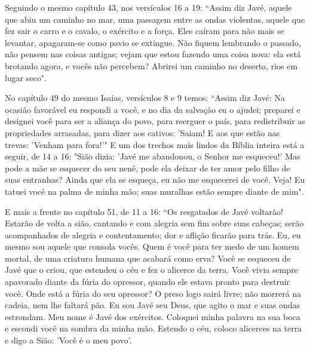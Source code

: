 \emdash{}Seguindo o mesmo capítulo 43, nos versículos 16 a 19: ``Assim diz Javé, aquele que abiu um caminho no mar, uma passagem entre as ondas violentas, aquele que fez sair o carro e o cavalo, o exército e a força. Eles caíram para não mais se levantar, apagaram-se como pavio se extingue. Não fiquem lembrando o passado, não pensem nas coisas antigas; vejam que estou fazendo uma coisa nova: ela está brotando agora, e vocês não percebem? Abrirei um caminho no deserto, rios em lugar seco".

\emdash{}No capítulo 49 do mesmo Isaías, versículos 8 e 9 temos: ``Assim diz Javé: Na ocasião favorável eu respondi a você, e no dia da salvação eu o ajudei; preparei e designei você para ser a aliança do povo, para reerguer o país, para redistribuir as propriedades arrasadas, para dizer aos cativos: 'Saiam! E aos que estão nas trevas: 'Venham para fora!'" E um dos trechos mais lindos da Bíblia inteira está a seguir, de 14 a 16: "Sião dizia: 'Javé me abandonou, o Senhor me esqueceu!' Mas pode a mãe se esquecer do seu nenê, pode ela deixar de ter amor pelo filho de suas entranhas? Ainda que ela se esqueça, eu não me esquecerei de você. Veja! Eu tatuei você na palma de minha mão; suas muralhas estão sempre diante de mim".

\emdash{}E mais a frente no capítulo 51, de 11 a 16: ``Os resgatados de Javé voltarão! Estarão de volta a sião, cantando e com alegria sem fim sobre suas cabeças; serão acompanhados de alegria e contentamento; dor e aflição ficarão para trás. Eu, eu mesmo sou aquele que consola vocês. Quem é você para ter medo de um homem mortal, de uma criatura humana que acabará como erva? Você se esqueceu de Javé que o criou, que estendeu o céu e fez o alicerce da terra. Você vivia sempre apavorado diante da fúria do opressor, quando ele estava pronto para destruir você. Onde está a fúria do seu opressor? O preso logo sairá livre; não morrerá na cadeia, nem lhe faltará pão. Eu sou Javé seu Deus, que agito o mar e suas ondas estrondam. Meu nome é Javé dos exércitos. Coloquei minha palavra na sua boca e escondi você na sombra da minha mão. Estendo o céu, coloco alicerces na terra e digo a Sião: 'Você é o meu povo'.